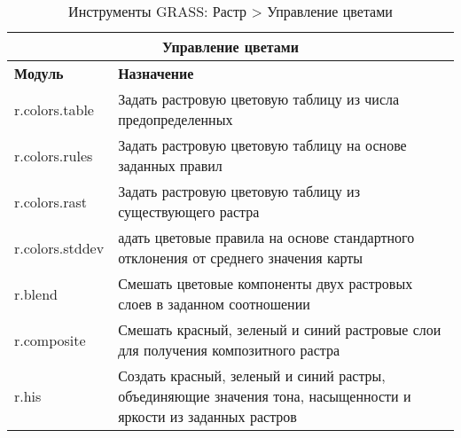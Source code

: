 {\renewcommand{\arraystretch}{0.7}
\begin{table}[H]
\centering
 \begin{tabular}{|p{4cm}|p{11cm}|}
  \hline \multicolumn{2}{|c|}{\textbf{Управление цветами}} \\
  \hline \textbf{Модуль} & \textbf{Назначение} \\
  \hline r.colors.table & Задать растровую цветовую таблицу из числа
  предопределенных \\
  \hline r.colors.rules & Задать растровую цветовую таблицу на основе
  заданных правил \\
  \hline r.colors.rast & Задать растровую цветовую таблицу из
  существующего растра \\
  \hline r.colors.stddev & адать цветовые правила на основе
  стандартного отклонения от среднего значения карты \\
  \hline r.blend & Смешать цветовые компоненты двух растровых слоев в
  заданном соотношении \\
  \hline r.composite & Смешать красный, зеленый и синий растровые слои
  для получения композитного растра \\
  \hline r.his & Создать  красный, зеленый и синий растры, объединяющие
  значения тона, насыщенности и яркости из заданных растров \\
\hline
\end{tabular}
\caption{Инструменты GRASS: Растр > Управление цветами}
\end{table}}

